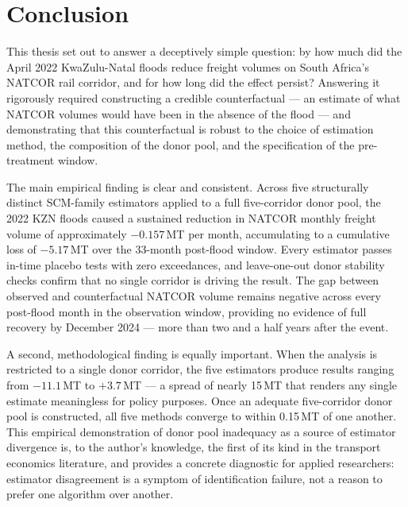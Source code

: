 
\section{Conclusion}
\label{sec:conclusion}

This thesis set out to answer a deceptively simple question: by how
much did the April 2022 KwaZulu-Natal floods reduce freight volumes
on South Africa's NATCOR rail corridor, and for how long did the
effect persist?
Answering it rigorously required constructing a credible
counterfactual --- an estimate of what NATCOR volumes would have been
in the absence of the flood --- and demonstrating that this
counterfactual is robust to the choice of estimation method, the
composition of the donor pool, and the specification of the
pre-treatment window.

The main empirical finding is clear and consistent.
Across five structurally distinct SCM-family estimators applied to a
full five-corridor donor pool, the 2022 KZN floods caused a sustained
reduction in NATCOR monthly freight volume of approximately
$-0.157$\,MT per month, accumulating to a cumulative loss of
$-5.17$\,MT over the 33-month post-flood window.
Every estimator passes in-time placebo tests with zero exceedances,
and leave-one-out donor stability checks confirm that no single
corridor is driving the result.
The gap between observed and counterfactual NATCOR volume remains
negative across every post-flood month in the observation window,
providing no evidence of full recovery by December 2024 --- more than
two and a half years after the event.

A second, methodological finding is equally important.
When the analysis is restricted to a single donor corridor, the five
estimators produce results ranging from $-11.1$\,MT to $+3.7$\,MT
--- a spread of nearly 15\,MT that renders any single estimate
meaningless for policy purposes.
Once an adequate five-corridor donor pool is constructed, all five
methods converge to within 0.15\,MT of one another.
This empirical demonstration of donor pool inadequacy as a source
of estimator divergence is, to the author's knowledge, the first
of its kind in the transport economics literature, and provides a
concrete diagnostic for applied researchers: estimator disagreement
is a symptom of identification failure, not a reason to prefer one
algorithm over another.

